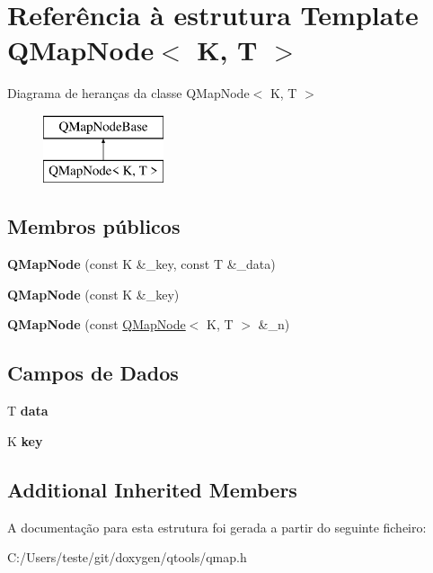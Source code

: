 \hypertarget{struct_q_map_node}{\section{Referência à estrutura Template Q\-Map\-Node$<$ K, T $>$}
\label{struct_q_map_node}
}
Diagrama de heranças da classe Q\-Map\-Node$<$ K, T $>$\begin{figure}[H]
\begin{center}
\leavevmode
\includegraphics[height=2.000000cm]{struct_q_map_node}
\end{center}
\end{figure}
\subsection*{Membros públicos}
\begin{DoxyCompactItemize}
\item 
\hypertarget{struct_q_map_node_a3599d1421711307ce7594f033e536591}{{\bfseries Q\-Map\-Node} (const K \&\-\_\-key, const T \&\-\_\-data)}\label{struct_q_map_node_a3599d1421711307ce7594f033e536591}

\item 
\hypertarget{struct_q_map_node_abd5d59dbb6e7b851afe684c934d87c35}{{\bfseries Q\-Map\-Node} (const K \&\-\_\-key)}\label{struct_q_map_node_abd5d59dbb6e7b851afe684c934d87c35}

\item 
\hypertarget{struct_q_map_node_a9598d0e993301b735b7d0e8a7ac1bdb4}{{\bfseries Q\-Map\-Node} (const \hyperlink{struct_q_map_node}{Q\-Map\-Node}$<$ K, T $>$ \&\-\_\-n)}\label{struct_q_map_node_a9598d0e993301b735b7d0e8a7ac1bdb4}

\end{DoxyCompactItemize}
\subsection*{Campos de Dados}
\begin{DoxyCompactItemize}
\item 
\hypertarget{struct_q_map_node_aa3ff051a47d9e18487e7b819852521c5}{T {\bfseries data}}\label{struct_q_map_node_aa3ff051a47d9e18487e7b819852521c5}

\item 
\hypertarget{struct_q_map_node_a3c4b6ab925b79dbfc65a0665665d5d9f}{K {\bfseries key}}\label{struct_q_map_node_a3c4b6ab925b79dbfc65a0665665d5d9f}

\end{DoxyCompactItemize}
\subsection*{Additional Inherited Members}


A documentação para esta estrutura foi gerada a partir do seguinte ficheiro\-:\begin{DoxyCompactItemize}
\item 
C\-:/\-Users/teste/git/doxygen/qtools/qmap.\-h\end{DoxyCompactItemize}

